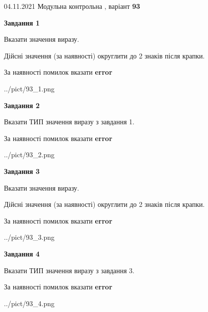 \documentclass[11pt, ukrainian]{article}
\begin{document}
{04.11.2021 Модульна контрольна , варіант  \No \textbf { 93 }\par}
{
\begin {large}
{\begin {center}\textbf{Завдання 1}\end {center}}\par
Вказати значення виразу. \par
Дійсні значення (за наявності) округлити до 2 знаків після крапки. \par
За наявності помилок вказати \textbf{error}

\begin{center}
	{../pict/93_1.png}
\end{center}
\newpage

{\begin {center}\textbf{Завдання 2}\end {center}}\par
Вказати ТИП значення виразу з завдання 1. \par
За наявності помилок вказати \textbf{error}

\begin{center}
	{../pict/93_2.png}
\end{center}
\newpage

{\begin {center}\textbf{Завдання 3}\end {center}}\par
Вказати значення виразу. \par
Дійсні значення (за наявності) округлити до 2 знаків після крапки. \par
За наявності помилок вказати \textbf{error}

\begin{center}
	{../pict/93_3.png}
\end{center}
\newpage

{\begin {center}\textbf{Завдання 4}\end {center}}\par
Вказати ТИП значення виразу з завдання 3. \par
За наявності помилок вказати \textbf{error}

\begin{center}
	{../pict/93_4.png}
\end{center}
\newpage


\end{large}}
\end{document}
